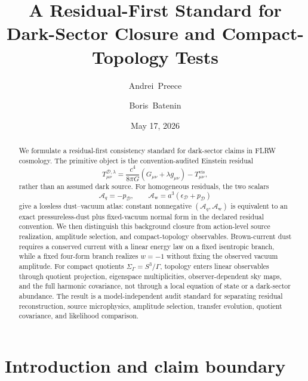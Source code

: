 \documentclass[
  aps,
  prd,
  reprint,
  superscriptaddress,
  floatfix,
  nofootinbib,
  longbibliography
]{revtex4-2}
\theoremstyle{plain}
\theoremstyle{definition}
\theoremstyle{remark}
\newcommand{\D}{\mathcal D}
\newcommand{\vis}{\mathrm{vis}}
\newcommand{\Aq}{\mathcal A_q}
\newcommand{\Aw}{\mathcal A_{\mathrm w}}
\begin{document}
\raggedbottom

\title{\texorpdfstring{A Residual-First Standard for Dark-Sector Closure and Compact-Topology Tests}
{A Residual-First Standard for Dark-Sector Closure and Compact-Topology Tests}}

\author{Andrei~Preece}

\author{Boris~Batenin}

\date{May 17, 2026}

\begin{abstract}
We formulate a residual-first consistency standard for dark-sector claims in FLRW cosmology.  The primitive object is the convention-audited Einstein residual
\begin{equation*}
T^{\D,\lambda}_{\mu\nu}
=\frac{c^4}{8\pi G}(G_{\mu\nu}+\lambda g_{\mu\nu})
-T^{\vis}_{\mu\nu},
\end{equation*}
rather than an assumed dark source.  For homogeneous residuals, the two scalars
\begin{equation*}
\Aq=-p_\D,
\qquad
\Aw=a^3(\epsilon_\D+p_\D)
\end{equation*}
give a lossless dust--vacuum atlas: constant nonnegative \((\Aq,\Aw)\) is equivalent to an exact pressureless-dust plus fixed-vacuum normal form in the declared residual convention.  We then distinguish this background closure from action-level source realization, amplitude selection, and compact-topology observables.  Brown-current dust requires a conserved current with a linear energy law on a fixed isentropic branch, while a fixed four-form branch realizes \(w=-1\) without fixing the observed vacuum amplitude.  For compact quotients \(\Sigma_\Gamma=S^3/\Gamma\), topology enters linear observables through quotient projection, eigenspace multiplicities, observer-dependent sky maps, and the full harmonic covariance, not through a local equation of state or a dark-sector abundance.  The result is a model-independent audit standard for separating residual reconstruction, source microphysics, amplitude selection, transfer evolution, quotient covariance, and likelihood comparison.
\end{abstract}

\maketitle

\section{Introduction and claim boundary}
\end{document}
